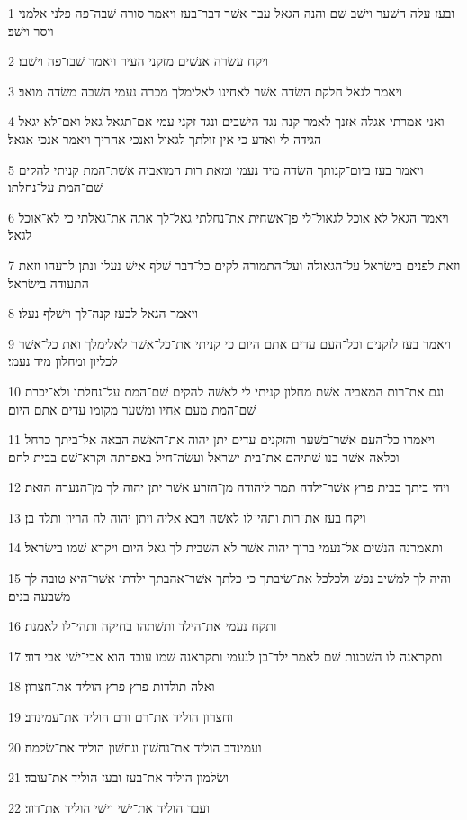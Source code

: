 \par 1 ובעז עלה השׁער וישׁב שׁם והנה הגאל עבר אשׁר דבר־בעז ויאמר סורה שׁבה־פה פלני אלמני ויסר וישׁב׃
\par 2 ויקח עשׂרה אנשׁים מזקני העיר ויאמר שׁבו־פה וישׁבו׃
\par 3 ויאמר לגאל חלקת השׂדה אשׁר לאחינו לאלימלך מכרה נעמי השׁבה משׂדה מואב׃
\par 4 ואני אמרתי אגלה אזנך לאמר קנה נגד הישׁבים ונגד זקני עמי אם־תגאל גאל ואם־לא יגאל הגידה לי ואדע כי אין זולתך לגאול ואנכי אחריך ויאמר אנכי אגאל׃
\par 5 ויאמר בעז ביום־קנותך השׂדה מיד נעמי ומאת רות המואביה אשׁת־המת קניתי להקים שׁם־המת על־נחלתו׃
\par 6 ויאמר הגאל לא אוכל לגאול־לי פן־אשׁחית את־נחלתי גאל־לך אתה את־גאלתי כי לא־אוכל לגאל׃
\par 7 וזאת לפנים בישׂראל על־הגאולה ועל־התמורה לקים כל־דבר שׁלף אישׁ נעלו ונתן לרעהו וזאת התעודה בישׂראל׃
\par 8 ויאמר הגאל לבעז קנה־לך וישׁלף נעלו׃
\par 9 ויאמר בעז לזקנים וכל־העם עדים אתם היום כי קניתי את־כל־אשׁר לאלימלך ואת כל־אשׁר לכליון ומחלון מיד נעמי׃
\par 10 וגם את־רות המאביה אשׁת מחלון קניתי לי לאשׁה להקים שׁם־המת על־נחלתו ולא־יכרת שׁם־המת מעם אחיו ומשׁער מקומו עדים אתם היום׃
\par 11 ויאמרו כל־העם אשׁר־בשׁער והזקנים עדים יתן יהוה את־האשׁה הבאה אל־ביתך כרחל וכלאה אשׁר בנו שׁתיהם את־בית ישׂראל ועשׂה־חיל באפרתה וקרא־שׁם בבית לחם׃
\par 12 ויהי ביתך כבית פרץ אשׁר־ילדה תמר ליהודה מן־הזרע אשׁר יתן יהוה לך מן־הנערה הזאת׃
\par 13 ויקח בעז את־רות ותהי־לו לאשׁה ויבא אליה ויתן יהוה לה הריון ותלד בן׃
\par 14 ותאמרנה הנשׁים אל־נעמי ברוך יהוה אשׁר לא השׁבית לך גאל היום ויקרא שׁמו בישׂראל׃
\par 15 והיה לך למשׁיב נפשׁ ולכלכל את־שׂיבתך כי כלתך אשׁר־אהבתך ילדתו אשׁר־היא טובה לך משׁבעה בנים׃
\par 16 ותקח נעמי את־הילד ותשׁתהו בחיקה ותהי־לו לאמנת׃
\par 17 ותקראנה לו השׁכנות שׁם לאמר ילד־בן לנעמי ותקראנה שׁמו עובד הוא אבי־ישׁי אבי דוד׃
\par 18 ואלה תולדות פרץ פרץ הוליד את־חצרון׃
\par 19 וחצרון הוליד את־רם ורם הוליד את־עמינדב׃
\par 20 ועמינדב הוליד את־נחשׁון ונחשׁון הוליד את־שׂלמה׃
\par 21 ושׂלמון הוליד את־בעז ובעז הוליד את־עובד׃
\par 22 ועבד הוליד את־ישׁי וישׁי הוליד את־דוד׃


